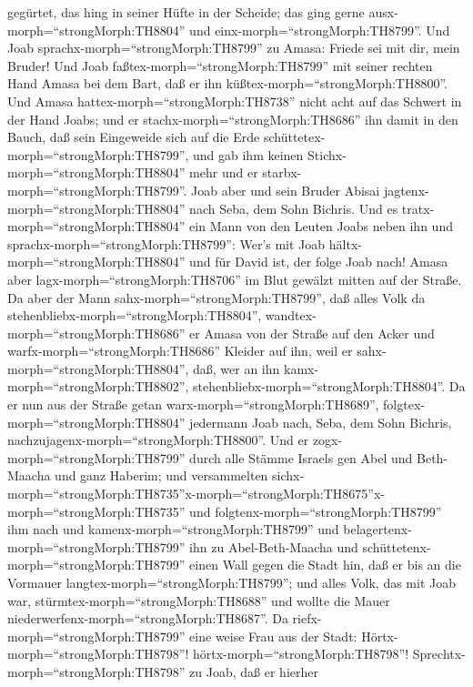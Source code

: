 gegürtet, das hing in seiner Hüfte in der Scheide; das ging gerne
ausx-morph=``strongMorph:TH8804'' und einx-morph=``strongMorph:TH8799''.
 Und Joab sprachx-morph=``strongMorph:TH8799'' zu Amasa:
Friede sei mit dir, mein Bruder! Und Joab
faßtex-morph=``strongMorph:TH8799'' mit seiner rechten Hand Amasa bei
dem Bart, daß er ihn küßtex-morph=``strongMorph:TH8800''. 
Und Amasa hattex-morph=``strongMorph:TH8738'' nicht acht auf das Schwert
in der Hand Joabs; und er stachx-morph=``strongMorph:TH8686'' ihn damit
in den Bauch, daß sein Eingeweide sich auf die Erde
schüttetex-morph=``strongMorph:TH8799'', und gab ihm keinen
Stichx-morph=``strongMorph:TH8804'' mehr und er
starbx-morph=``strongMorph:TH8799''. Joab aber und sein Bruder Abisai
jagtenx-morph=``strongMorph:TH8804'' nach Seba, dem Sohn Bichris.
 Und es tratx-morph=``strongMorph:TH8804'' ein Mann von den
Leuten Joabs neben ihn und sprachx-morph=``strongMorph:TH8799'': Wer's
mit Joab hältx-morph=``strongMorph:TH8804'' und für David ist, der folge
Joab nach!  Amasa aber lagx-morph=``strongMorph:TH8706'' im
Blut gewälzt mitten auf der Straße. Da aber der Mann
sahx-morph=``strongMorph:TH8799'', daß alles Volk da
stehenbliebx-morph=``strongMorph:TH8804'',
wandtex-morph=``strongMorph:TH8686'' er Amasa von der Straße auf den
Acker und warfx-morph=``strongMorph:TH8686'' Kleider auf ihn, weil er
sahx-morph=``strongMorph:TH8804'', daß, wer an ihn
kamx-morph=``strongMorph:TH8802'',
stehenbliebx-morph=``strongMorph:TH8804''.  Da er nun aus
der Straße getan warx-morph=``strongMorph:TH8689'',
folgtex-morph=``strongMorph:TH8804'' jedermann Joab nach, Seba, dem Sohn
Bichris, nachzujagenx-morph=``strongMorph:TH8800''.  Und er
zogx-morph=``strongMorph:TH8799'' durch alle Stämme Israels gen Abel und
Beth-Maacha und ganz Haberim; und versammelten
sichx-morph=``strongMorph:TH8735''\textbar x-morph=``strongMorph:TH8675''x-morph=``strongMorph:TH8735''
und folgtenx-morph=``strongMorph:TH8799'' ihm nach  und
kamenx-morph=``strongMorph:TH8799'' und
belagertenx-morph=``strongMorph:TH8799'' ihn zu Abel-Beth-Maacha und
schüttetenx-morph=``strongMorph:TH8799'' einen Wall gegen die Stadt hin,
daß er bis an die Vormauer langtex-morph=``strongMorph:TH8799''; und
alles Volk, das mit Joab war, stürmtex-morph=``strongMorph:TH8688'' und
wollte die Mauer niederwerfenx-morph=``strongMorph:TH8687''.
 Da riefx-morph=``strongMorph:TH8799'' eine weise Frau aus
der Stadt: Hörtx-morph=``strongMorph:TH8798''!
hörtx-morph=``strongMorph:TH8798''!
Sprechtx-morph=``strongMorph:TH8798'' zu Joab, daß er hierher
